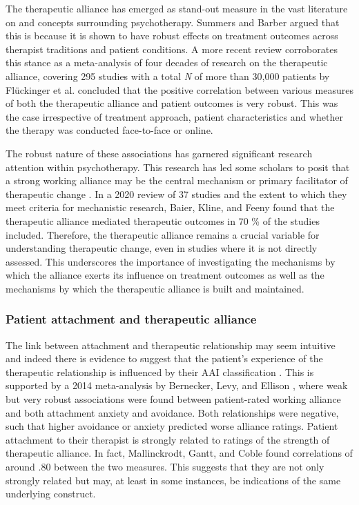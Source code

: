 \documentclass[12pt]{report}
\begin{document}
The therapeutic alliance has emerged as stand-out measure in the vast literature on and concepts surrounding psychotherapy. Summers and Barber \citeyear{Summers2003} argued that this is because it is shown to have robust effects on treatment outcomes across therapist traditions and patient conditions.
A more recent review corroborates this stance as a meta-analysis of four decades of research on the therapeutic alliance, covering 295 studies with a total \textit{N} of more than 30,000 patients by Flückinger et al. \citeyear{Fluckinger2018} concluded that the positive correlation between various measures of both the therapeutic alliance and patient outcomes is very robust.
This was the case irrespective of treatment approach, patient characteristics and whether the therapy was conducted face-to-face or online.

The robust nature of these associations has garnered significant research attention within psychotherapy. This research has led some scholars to posit that a strong working alliance may be the central mechanism or primary facilitator of therapeutic change \cite{RodgersCailholBuiEtAl2010}.
In a 2020 review of 37 studies and the extent to which they meet criteria for mechanistic research, Baier, Kline, and Feeny \citeyear{Baier2020} found that the therapeutic alliance mediated therapeutic outcomes in 70 \% of the studies included.
Therefore, the therapeutic alliance remains a crucial variable for understanding therapeutic change, even in studies where it is not directly assessed.  This underscores the importance of investigating the mechanisms by which the alliance exerts its influence on treatment outcomes as well as the mechanisms by which the therapeutic alliance is built and maintained.

\subsubsection*{Patient attachment and therapeutic alliance}
The link between attachment and therapeutic relationship may seem intuitive and indeed there is evidence to suggest that the patient's experience of the therapeutic relationship is influenced by their AAI classification \cite{Talia2019}.
This is supported by a 2014 meta-analysis by Bernecker, Levy, and Ellison \citeyear{Bernecker2014}, where weak but very robust associations were found between patient-rated working alliance and both attachment anxiety and avoidance. Both relationships were negative, such that higher avoidance or anxiety predicted worse alliance ratings.
Patient attachment to their therapist is strongly related to ratings of the strength of therapeutic alliance. In fact, Mallinckrodt, Gantt, and Coble \citeyear{Mallinckrodt1995} found correlations of around .80 between the two measures. This suggests that they are not only strongly related but may, at least in some instances, be indications of the same underlying construct.
\end{document}
